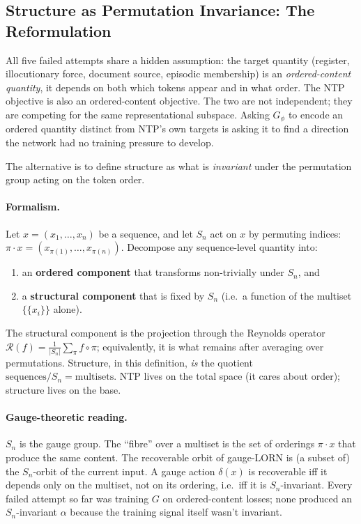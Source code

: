 \documentclass[11pt, a4paper]{article}
\theoremstyle{plain}
\theoremstyle{definition}
\theoremstyle{remark}
\begin{document}
\subsection{Structure as Permutation Invariance: The Reformulation}
\label{sec:permutation-invariance}

All five failed attempts share a hidden assumption: the target quantity (register, illocutionary force, document source, episodic membership) is an \emph{ordered-content quantity}, it depends on both which tokens appear and in what order.
The NTP objective is also an ordered-content objective.
The two are not independent; they are competing for the same representational subspace.
Asking $G_\phi$ to encode an ordered quantity distinct from NTP's own targets is asking it to find a direction the network had no training pressure to develop.

The alternative is to define structure as what is \emph{invariant} under the permutation group acting on the token order.

\paragraph{Formalism.}
Let $x = (x_1, \dots, x_n)$ be a sequence, and let $S_n$ act on $x$ by permuting indices: $\pi \cdot x = (x_{\pi(1)}, \dots, x_{\pi(n)})$.
Decompose any sequence-level quantity into:
\begin{enumerate}[nosep]
\item an \textbf{ordered component} that transforms non-trivially under $S_n$, and
\item a \textbf{structural component} that is fixed by $S_n$ (i.e.\ a function of the multiset $\{\!\{x_i\}\!\}$ alone).
\end{enumerate}
The structural component is the projection through the Reynolds operator $\mathcal{R}(f) = \frac{1}{|S_n|} \sum_{\pi} f \circ \pi$; equivalently, it is what remains after averaging over permutations.
Structure, in this definition, \emph{is} the quotient $\text{sequences} / S_n = \text{multisets}$.
NTP lives on the total space (it cares about order); structure lives on the base.

\paragraph{Gauge-theoretic reading.}
$S_n$ is the gauge group.
The ``fibre'' over a multiset is the set of orderings $\pi \cdot x$ that produce the same content.
The recoverable orbit of gauge-LORN is (a subset of) the $S_n$-orbit of the current input.
A gauge action $\delta(x)$ is recoverable iff it depends only on the multiset, not on its ordering, i.e.\ iff it is $S_n$-invariant.
Every failed attempt so far was training $G$ on ordered-content losses; none produced an $S_n$-invariant $\alpha$ because the training signal itself wasn't invariant.
\end{document}
